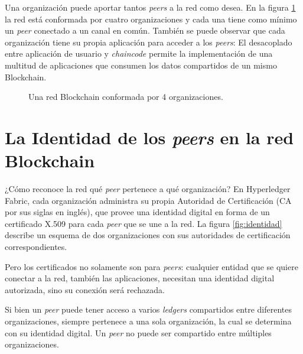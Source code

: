 Una organización puede aportar tantos \textit{peers}  a la red como desea. En la figura \ref{fig:organizations} la red está conformada por cuatro organizaciones y cada una tiene como mínimo un \textit{peer} conectado a un canal en común. También se puede observar que cada organización tiene su propia aplicación para acceder a los \textit{peers}: El desacoplado entre aplicación de usuario y \textit{chaincode} permite la implementación de una multitud de aplicaciones que consumen los datos compartidos de un mismo Blockchain.

\begin{figure}[H] %
    \caption{Una red Blockchain conformada por 4 organizaciones.}
    \label{fig:organizations}
\end{figure}

\section{La Identidad de los \textit{peers} en la red Blockchain}
\label{sec:identidad_de_peers}
¿Cómo reconoce la red qué \textit{peer} pertenece a qué organización? En Hyperledger Fabric, cada organización administra su propia Autoridad de Certificación (CA por sus siglas en inglés), que provee una identidad digital en forma de un certificado X.509 para cada \textit{peer} que se une a la red. La figura \ref{fig:identidad} describe un esquema de dos organizaciones con sus autoridades de certificación correspondientes.

Pero los certificados no solamente son para \textit{peers}: cualquier entidad que se quiere conectar a la red, también las aplicaciones, necesitan una identidad digital autorizada, sino su conexión será rechazada.

Si bien un \textit{peer} puede tener acceso a varios \textit{ledgers} compartidos entre diferentes organizaciones, siempre pertenece a una sola organización, la cual se determina con su identidad digital. Un \textit{peer} no puede ser compartido entre múltiples organizaciones.

